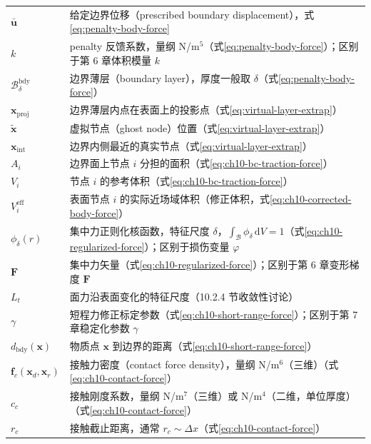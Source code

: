 {{\small
\begin{tabular}{@{}p{}@{}p{}@{}}
  $\bar{\mathbf{u}}$ & 给定边界位移（prescribed boundary displacement），式\eqref{eq:penalty-body-force} \\
  $k$ & penalty 反馈系数，量纲 N/m$^{5}$（式\eqref{eq:penalty-body-force}）；区别于第 6 章体积模量 $k$ \\
  $\mathcal{B}_{\delta}^{\text{bdy}}$ & 边界薄层（boundary layer），厚度一般取 $\delta$（式\eqref{eq:penalty-body-force}） \\
  $\mathbf{x}_{\text{proj}}$ & 边界薄层内点在表面上的投影点（式\eqref{eq:virtual-layer-extrap}） \\
  $\tilde{\mathbf{x}}$ & 虚拟节点（ghost node）位置（式\eqref{eq:virtual-layer-extrap}） \\
  $\mathbf{x}_{\text{int}}$ & 边界内侧最近的真实节点（式\eqref{eq:virtual-layer-extrap}） \\
  $A_{i}$ & 边界面上节点 $i$ 分担的面积（式\eqref{eq:ch10-bc-traction-force}） \\
  $V_{i}$ & 节点 $i$ 的参考体积（式\eqref{eq:ch10-bc-traction-force}） \\
  $V_{i}^{\text{eff}}$ & 表面节点 $i$ 的实际近场域体积（修正体积，式\eqref{eq:ch10-corrected-body-force}） \\
  $\phi_{\delta}(r)$ & 集中力正则化核函数，特征尺度 $\delta$，$\int_{\mathcal{B}}\phi_{\delta}\,\mathrm{d}V=1$（式\eqref{eq:ch10-regularized-force}）；区别于损伤变量 $\varphi$ \\
  $\mathbf{F}$ & 集中力矢量（式\eqref{eq:ch10-regularized-force}）；区别于第 6 章变形梯度 $\mathbf{F}$ \\
  $L_{t}$ & 面力沿表面变化的特征尺度（10.2.4 节收敛性讨论） \\
  $\gamma$ & 短程力修正标定参数（式\eqref{eq:ch10-short-range-force}）；区别于第 7 章稳定化参数 $\gamma$ \\
  $d_{\text{bdy}}(\mathbf{x})$ & 物质点 $\mathbf{x}$ 到边界的距离（式\eqref{eq:ch10-short-range-force}） \\
  $\mathbf{f}_{c}(\mathbf{x}_{d},\mathbf{x}_{r})$ & 接触力密度（contact force density），量纲 N/m$^{6}$（三维）（式\eqref{eq:ch10-contact-force}） \\
  $c_{c}$ & 接触刚度系数，量纲 N/m$^{7}$（三维）或 N/m$^{4}$（二维，单位厚度）（式\eqref{eq:ch10-contact-force}） \\
  $r_{c}$ & 接触截止距离，通常 $r_{c}\sim\Delta x$（式\eqref{eq:ch10-contact-force}） \\

\end{tabular}}}
